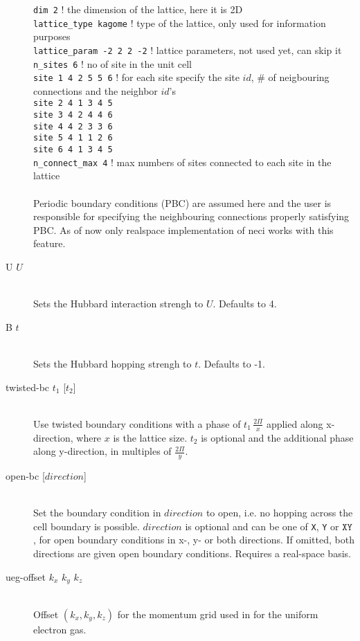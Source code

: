 \documentclass[a4paper,notitlepage,dvipsnames]{scrreprt}
\newcommand\codeitem[1]{\needspace{1.5\baselineskip}\item[\textnormal{\ttfamily #1 \nopagebreak}] \hfill \\ \nopagebreak}
\let\code\lstinline
\begin{document}
\begin{description}
		  \code{dim 2}   ! the dimension of the lattice, here it is 2D\\   
		  \code{lattice_type kagome} ! type of the lattice, only used for information purposes\\
		  \code{lattice_param -2 2 2 -2} ! lattice parameters, not used yet, can skip it\\
		  \code{n_sites 6} ! no of site in the unit cell\\
		  \code{site 1 4 2 5 5 6} ! for each site specify the site $id$, \# of neigbouring connections and the neighbor $id$'s\\
		  \code{site 2 4 1 3 4 5}\\
		  \code{site 3 4 2 4 4 6}\\
		  \code{site 4 4 2 3 3 6}\\
		  \code{site 5 4 1 1 2 6}\\
		  \code{site 6 4 1 3 4 5} \\
		  \code{n_connect_max 4} ! max numbers of sites connected to each site in the lattice\\\\
		  Periodic boundary conditions (PBC) are assumed here and the user is responsible for specifying the neighbouring connections properly satisfying PBC. 
		  As of now only realspace implementation of neci works with this feature.  
    \codeitem{U $U$}
    Sets the Hubbard interaction strengh to $U$. Defaults to 4.
    \codeitem{B $t$}
    Sets the Hubbard hopping strengh to $t$. Defaults to -1.
    \codeitem{twisted-bc $t_1$ [$t_2$]}
    Use twisted boundary conditions with a phase of $t_1 \, \frac{2\Pi}{x}$
    applied along x-direction, where $x$ is the lattice size. $t_2$ is
    optional and the additional phase along y-direction, in multiples of
    $\frac{2\Pi}{y}$.
    \codeitem{open-bc [$direction$]}
    Set the boundary condition in $direction$ to open, i.e. no hopping across
    the cell boundary is possible. $direction$ is optional and can be one of
    \texttt{X}, \texttt{Y} or $\texttt{XY}$, for open boundary conditions in
    x-, y- or both directions. If omitted, both directions are given open
    boundary conditions. Requires a real-space basis.
    \codeitem{ueg-offset $k_x$ $k_y$ $k_z$}
    Offset $(k_x, k_y, k_z)$ for the momentum grid used in for the uniform
    electron gas.
  \end{description}
\end{document}
